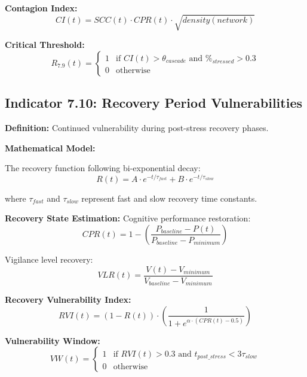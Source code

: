 \documentclass[11pt,a4paper]{article}
\begin{document}
\textbf{Contagion Index:}
\begin{equation}
CI(t) = SCC(t) \cdot CPR(t) \cdot \sqrt{density(network)}
\end{equation}

\textbf{Critical Threshold:}
\begin{equation}
R_{7.9}(t) = \begin{cases}
1 & \text{if } CI(t) > \theta_{cascade} \text{ and } \%_{stressed} > 0.3 \\
0 & \text{otherwise}
\end{cases}
\end{equation}

\subsection{Indicator 7.10: Recovery Period Vulnerabilities}

\textbf{Definition:} Continued vulnerability during post-stress recovery phases.

\textbf{Mathematical Model:}

The recovery function following bi-exponential decay:
\begin{equation}
R(t) = A \cdot e^{-t/\tau_{fast}} + B \cdot e^{-t/\tau_{slow}}
\end{equation}

where $\tau_{fast}$ and $\tau_{slow}$ represent fast and slow recovery time constants.

\textbf{Recovery State Estimation:}
Cognitive performance restoration:
\begin{equation}
CPR(t) = 1 - \left(\frac{P_{baseline} - P(t)}{P_{baseline} - P_{minimum}}\right)
\end{equation}

Vigilance level recovery:
\begin{equation}
VLR(t) = \frac{V(t) - V_{minimum}}{V_{baseline} - V_{minimum}}
\end{equation}

\textbf{Recovery Vulnerability Index:}
\begin{equation}
RVI(t) = (1 - R(t)) \cdot \left(\frac{1}{1 + e^{\alpha \cdot (CPR(t) - 0.5)}}\right)
\end{equation}

\textbf{Vulnerability Window:}
\begin{equation}
VW(t) = \begin{cases}
1 & \text{if } RVI(t) > 0.3 \text{ and } t_{post\_stress} < 3 \tau_{slow} \\
0 & \text{otherwise}
\end{cases}
\end{equation}
\end{document}
